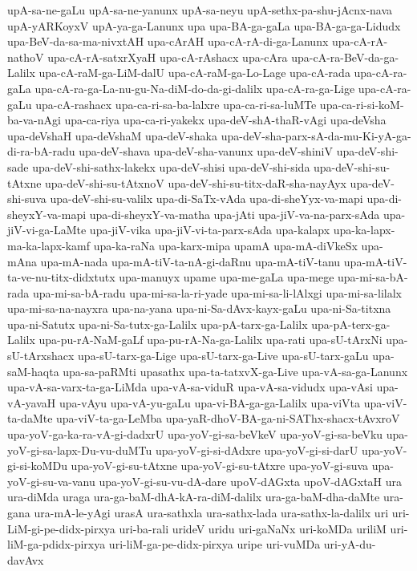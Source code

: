 {upA-sa-ne-gaLu
upA-sa-ne-yanunx
upA-sa-neyu
upA-sethx-pa-shu-jAcnx-nava
upA-yARKoyxV
upA-ya-ga-Lanunx
upa
upa-BA-ga-gaLa
upa-BA-ga-ga-Lidudx
upa-BeV-da-sa-ma-nivxtAH
upa-cArAH
upa-cA-rA-di-ga-Lanunx
upa-cA-rA-nathoV
upa-cA-rA-satxrXyaH
upa-cA-rAshacx
upa-cAra
upa-cA-ra-BeV-da-ga-Lalilx
upa-cA-raM-ga-LiM-dalU
upa-cA-raM-ga-Lo-Lage
upa-cA-rada
upa-cA-ra-gaLa
upa-cA-ra-ga-La-nu-gu-Na-diM-do-da-gi-dalilx
upa-cA-ra-ga-Lige
upa-cA-ra-gaLu
upa-cA-rashacx
upa-ca-ri-sa-ba-lalxre
upa-ca-ri-sa-luMTe
upa-ca-ri-si-koM-ba-va-nAgi
upa-ca-riya
upa-ca-ri-yakekx
upa-deV-shA-thaR-vAgi
upa-deVsha
upa-deVshaH
upa-deVshaM
upa-deV-shaka
upa-deV-sha-parx-sA-da-mu-Ki-yA-ga-di-ra-bA-radu
upa-deV-shava
upa-deV-sha-vanunx
upa-deV-shiniV
upa-deV-shi-sade
upa-deV-shi-sathx-lakekx
upa-deV-shisi
upa-deV-shi-sida
upa-deV-shi-su-tAtxne
upa-deV-shi-su-tAtxnoV
upa-deV-shi-su-titx-daR-sha-nayAyx
upa-deV-shi-suva
upa-deV-shi-su-valilx
upa-di-SaTx-vAda
upa-di-sheYyx-va-mapi
upa-di-sheyxY-va-mapi
upa-di-sheyxY-va-matha
upa-jAti
upa-jiV-va-na-parx-sAda
upa-jiV-vi-ga-LaMte
upa-jiV-vika
upa-jiV-vi-ta-parx-sAda
upa-kalapx
upa-ka-lapx-ma-ka-lapx-kamf
upa-ka-raNa
upa-karx-mipa
upamA
upa-mA-diVkeSx
upa-mAna
upa-mA-nada
upa-mA-tiV-ta-nA-gi-daRnu
upa-mA-tiV-tanu
upa-mA-tiV-ta-ve-nu-titx-didxtutx
upa-manuyx
upame
upa-me-gaLa
upa-mege
upa-mi-sa-bA-rada
upa-mi-sa-bA-radu
upa-mi-sa-la-ri-yade
upa-mi-sa-li-lAlxgi
upa-mi-sa-lilalx
upa-mi-sa-na-nayxra
upa-na-yana
upa-ni-Sa-dAvx-kayx-gaLu
upa-ni-Sa-titxna
upa-ni-Satutx
upa-ni-Sa-tutx-ga-Lalilx
upa-pA-tarx-ga-Lalilx
upa-pA-terx-ga-Lalilx
upa-pu-rA-NaM-gaLf
upa-pu-rA-Na-ga-Lalilx
upa-rati
upa-sU-tArxNi
upa-sU-tArxshacx
upa-sU-tarx-ga-Lige
upa-sU-tarx-ga-Live
upa-sU-tarx-gaLu
upa-saM-haqta
upa-sa-paRMti
upasathx
upa-ta-tatxvX-ga-Live
upa-vA-sa-ga-Lanunx
upa-vA-sa-varx-ta-ga-LiMda
upa-vA-sa-viduR
upa-vA-sa-vidudx
upa-vAsi
upa-vA-yavaH
upa-vAyu
upa-vA-yu-gaLu
upa-vi-BA-ga-ga-Lalilx
upa-viVta
upa-viV-ta-daMte
upa-viV-ta-ga-LeMba
upa-yaR-dhoV-BA-ga-ni-SAThx-shacx-tAvxroV
upa-yoV-ga-ka-ra-vA-gi-dadxrU
upa-yoV-gi-sa-beVkeV
upa-yoV-gi-sa-beVku
upa-yoV-gi-sa-lapx-Du-vu-duMTu
upa-yoV-gi-si-dAdxre
upa-yoV-gi-si-darU
upa-yoV-gi-si-koMDu
upa-yoV-gi-su-tAtxne
upa-yoV-gi-su-tAtxre
upa-yoV-gi-suva
upa-yoV-gi-su-va-vanu
upa-yoV-gi-su-vu-dA-dare
upoV-dAGxta
upoV-dAGxtaH
ura
ura-diMda
uraga
ura-ga-baM-dhA-kA-ra-diM-dalilx
ura-ga-baM-dha-daMte
ura-gana
ura-mA-le-yAgi
urasA
ura-sathxla
ura-sathx-lada
ura-sathx-la-dalilx
uri
uri-LiM-gi-pe-didx-pirxya
uri-ba-rali
urideV
uridu
uri-gaNaNx
uri-koMDa
uriliM
uri-liM-ga-pdidx-pirxya
uri-liM-ga-pe-didx-pirxya
uripe
uri-vuMDa
uri-yA-du-davAvx
}
